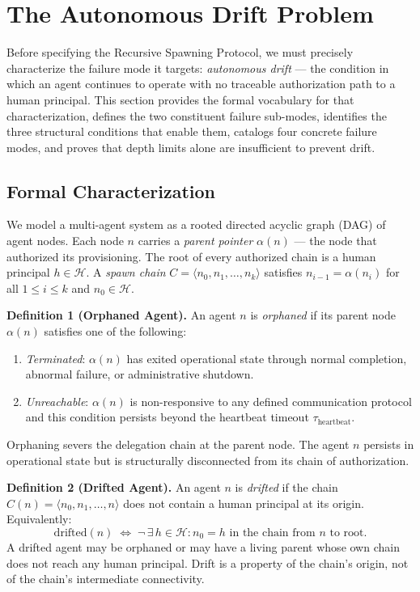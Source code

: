 \section{The Autonomous Drift Problem}
\label{sec:rs-drift}

Before specifying the Recursive Spawning Protocol, we must precisely characterize the failure mode it targets: \emph{autonomous drift} — the condition in which an agent continues to operate with no traceable authorization path to a human principal. This section provides the formal vocabulary for that characterization, defines the two constituent failure sub-modes, identifies the three structural conditions that enable them, catalogs four concrete failure modes, and proves that depth limits alone are insufficient to prevent drift.

\subsection{Formal Characterization}
\label{sec:rs-drift-formal}

We model a multi-agent system as a rooted directed acyclic graph (DAG) of agent nodes. Each node $n$ carries a \emph{parent pointer} $\alpha(n)$ — the node that authorized its provisioning. The root of every authorized chain is a human principal $h \in \mathcal{H}$. A \emph{spawn chain} $C = \langle n_0, n_1, \ldots, n_k \rangle$ satisfies $n_{i-1} = \alpha(n_i)$ for all $1 \leq i \leq k$ and $n_0 \in \mathcal{H}$.

\medskip
\noindent\textbf{Definition 1 (Orphaned Agent).}
An agent $n$ is \emph{orphaned} if its parent node $\alpha(n)$ satisfies one of the following:
\begin{enumerate}
  \item[(a)] \emph{Terminated}: $\alpha(n)$ has exited operational state through normal completion, abnormal failure, or administrative shutdown.
  \item[(b)] \emph{Unreachable}: $\alpha(n)$ is non-responsive to any defined communication protocol and this condition persists beyond the heartbeat timeout $\tau_{\mathrm{heartbeat}}$.
\end{enumerate}
Orphaning severs the delegation chain at the parent node. The agent $n$ persists in operational state but is structurally disconnected from its chain of authorization.

\medskip
\noindent\textbf{Definition 2 (Drifted Agent).}
An agent $n$ is \emph{drifted} if the chain $C(n) = \langle n_0, n_1, \ldots, n \rangle$ does not contain a human principal at its origin. Equivalently:
\begin{equation}
\mathrm{drifted}(n) \;\iff\; \neg\,\exists\, h \in \mathcal{H} : n_0 = h \text{ in the chain from } n \text{ to root}.
\label{eq:rs-drifted-def}
\end{equation}
A drifted agent may be orphaned or may have a living parent whose own chain does not reach any human principal. Drift is a property of the chain's origin, not of the chain's intermediate connectivity.

